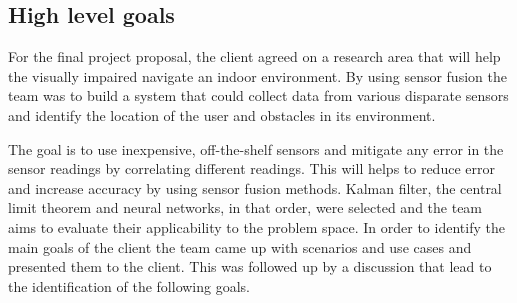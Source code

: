 \documentclass[prodmode,acmtosem]{acmsmall} %
\begin{document}

\subsection{High level goals}

For the final project proposal, the client agreed on a research area that will help the visually impaired navigate an indoor environment.
By using sensor fusion the team was to build a system that could collect data from various disparate sensors and identify the location of the user and obstacles in its environment.

The goal is to use inexpensive, off-the-shelf sensors and mitigate any error in the sensor readings by correlating different readings. This will helps to reduce error and increase accuracy by using sensor fusion methods. Kalman filter, the central limit theorem and neural networks, in that order, were selected and the team aims to evaluate their applicability to the problem space. In order to identify the main goals of the client the team came up with scenarios and use cases and presented them to the client. This was followed up by a discussion that lead to the identification of the following goals.
\end{document}

